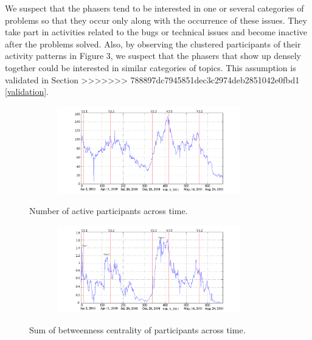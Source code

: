 \documentclass[conference]{IEEEtran}
\begin{document}
We suspect that the phasers tend to be interested in one or several
categories of problems so that they occur only along with the
occurrence of these issues. They take part in activities related to
the bugs or technical issues and become inactive after the problems
solved. Also, by observing the clustered participants of their
activity patterns in Figure 3, we suspect that the phasers that show
up densely together could be interested in similar categories of
topics. This assumption is validated in Section
>>>>>>> 788897dc7945851dec3c2974deb2851042e0fbd1
\ref{validation}. 


\begin{figure}[!t]
\centerline{\includegraphics[width=4.1in, height = 3.8cm]{people.png}
\label{people}}
\caption{Number of active participants across time.}
\end{figure}

\begin{figure}[!t]
\centerline{\includegraphics[width=4.1in, height = 3.8cm]{betweenness.png}
\label{betweenness}}
\caption{Sum of betweenness centrality of participants across time.}
\end{figure}
\end{document}
